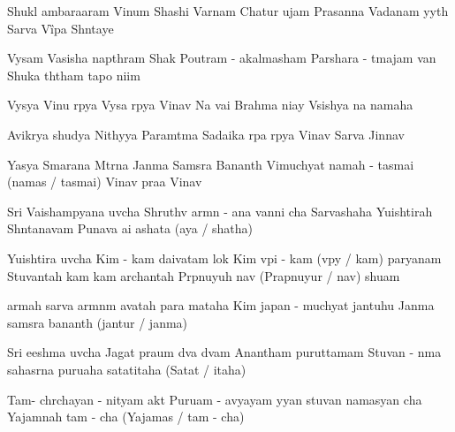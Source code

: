 \documentclass[20pt]{article}
\begin{document}

\SlokaHuge
{Shukl{\A} ambara{\dhh}aram Vi{\sh}num} {Shashi Varnam Chatur {\Bh}ujam}
{Prasanna Vadanam {\Dh}y{\A}y{\e}th} {Sarva Vi{\G}{\no}pa Sh{\A}ntaye}

\phantom{\countr}
\SlokaHuge
{Vy{\A}sam Vasish{\T}a napth{\A}ram} {Shak{\teh} Poutram - akalmasham}
{Par{\A}shara - {\A}tmajam van{\de}} {Shuka th{\A}tham tapo ni{\dhh}im}

\SlokaHuge
{Vy{\A}s{\A}ya Vi{\sh}nu r{\oo}p{\A}ya} {Vy{\A}sa r{\oo}p{\A}ya Vi{\sh}nav{\e}}
{Na{\mo} vai Brahma ni{\dhh}ay{\e}} {V{\aaa}sish{\T}{\A}ya na{\mo} namaha}

\newpage

\SlokaHuge
{Avik{\A}r{\A}ya shud{\dhh}{\A}ya} {Nithy{\A}ya Param{\A}tma{\nE}}
{Sadaika r{\oo}pa r{\oo}p{\A}ya} {Vi{\sh}nav{\e} Sarva Ji{\sh}nnav{\e}}

\SlokaHuge
{Yasya Smarana M{\A}tr{\e}na} {Janma Sams{\A}ra Ban{\dhh}an{\A}th}
{Vimuchyat{\e} namah - tasmai (namas / tasmai)} {Vi{\sh}nav{\e} pra{\bh}a Vi{\sh}nav{\e}}


\SlokaHeaderHuge
{Sri Vaishamp{\A}yana uv{\A}cha}
{Shruthv{\A} {\Dh}arm{\A}n - a{\she}{\she}na} {{\Pa}van{\A}ni cha Sarvashaha}
{Yu{\dhh}ishtirah Sh{\A}ntanavam} {Puna{\re}va \dsh a{\bh}i \dsh a{\bha}shata (a{\bh}ya / {\bha}shatha)}

\newpage

\SlokaHeaderHuge
{Yu{\dhh}ishtira uv{\A}cha}
{Kim - {\e}kam daivatam lok{\e}} {Kim v{\A}pi - {\e}kam (v{\A}py{\e} / kam) par{\A}yanam}
{Stuvantah kam kam \dsh archantah} {Pr{\A}pnuyuh \dsh {\ma}nav{\ah} (Prapnuyur / {\ma}nav{\ah}) shu{\bh}am}

\SlokaHuge
{{\Ko} {\Dh}armah sarva {\Dh}arm{\A}n{\aaa}m} {{\bh}avatah para{\mo} mataha}
{Kim japan - muchyat{\e} jantuhu} {Janma sams{\A}ra ban{\dhh}an{\A}th (jantur / janma)}

\SlokaHeaderHuge
{Sri {\Bh}eeshma uv{\A}cha}
{Jagat pra{\bh}um d{\e}va d{\e}vam} {Anantham puru{\sh}{\oh}ttamam}
{Stuvan - n{\A}ma sahasr{\e}na} {puru{\sh}aha satat{\oh}{\Th}itaha (Satat{\oh} / {\Th}itaha)}

\newpage

\SlokaHuge
{Tam-{\eva} ch{\aaa}rchayan - nityam} {{\Bh}akt{\ya} Puru{\sh}am - avyayam}
{{\Dh}y{\A}yan stuvan namasyan \dsh cha} {Yajam{\aaa}nah tam - {\eva} cha (Yajam{\an}as / tam - {\eva} cha)}
\end{document}
